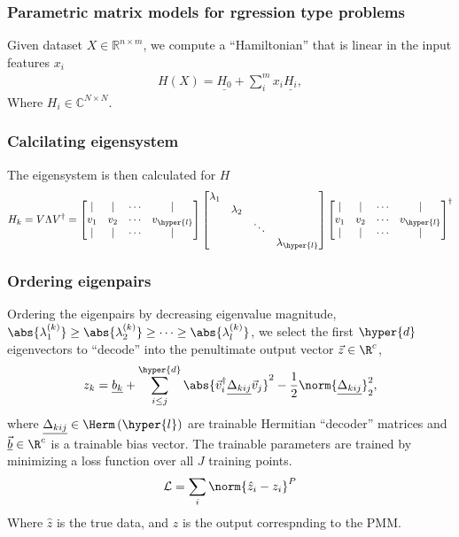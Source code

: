 \documentclass{beamer}
\begin{document}
\begin{frame}
\frametitle{Parametric matrix models for rgression type problems}

Given dataset $X\in \mathbb{R}^{n\times m}$, we compute a ``Hamiltonian'' that is linear in the input features $x_i$
\[
\begin{aligned}
        H(X) = \underline{H_0} +\sum_i^mx_i\underline{H_i},
\end{aligned}
\]
Where $H_i\in \mathbb{C}^{N\times N}$.
\end{frame}

\begin{frame}
\frametitle{Calcilating eigensystem}

The eigensystem is then calculated for $H$
\[
    H_k = V\Lambda V^\dagger = %
    \begin{bmatrix}
        \vert & \vert & \cdots & \vert \\
        v_1 & v_2 & \cdots & v_{\hyper{l}}\\
        \vert & \vert & \cdots & \vert
    \end{bmatrix}%
    \begin{bmatrix}
        \lambda_1 & & & \\
        & \lambda_2 & & \\
        & & \ddots & \\
        & & & \lambda_{\hyper{l}}
    \end{bmatrix}%
    \begin{bmatrix}
        \vert & \vert & \cdots & \vert \\
        v_1 & v_2 & \cdots & v_{\hyper{l}}\\
        \vert & \vert & \cdots & \vert
    \end{bmatrix}^\dagger
\]
\end{frame}

\begin{frame}
\frametitle{Ordering eigenpairs}

Ordering the eigenpairs by decreasing eigenvalue magnitude, $\abs{\lambda^{(k)}_1}\geq\abs{\lambda^{(k)}_2}\geq\cdots\geq\abs{\lambda^{(k)}_l}$, we select the first $\hyper{d}$ eigenvectors to ``decode'' into the penultimate output vector $\vec{z}\in\R^c$,
\[
    z_k = \underline{b_k} + \sum_{i\leq j}^{\hyper{d}}\abs{\vec{v}_i^\dagger \underline{\Delta_{kij}} \vec{v}_j}^2 - \frac{1}{2}\norm{\underline{\Delta_{kij}}}_2^2,
\]
where $\underline{\Delta_{kij}}\in\Herm\left(\hyper{l}\right)$ are trainable Hermitian ``decoder'' matrices and $\underline{\vec{b}}\in\R^c$ is a trainable bias vector. The trainable parameters are trained by minimizing a loss function over all $J$ training points.
\[
    \mathcal{L} = \sum_i\norm{\hat{z}_i-z_i}^P
\]
Where $\hat{z}$ is the true data, and $z$ is the output correspnding to the PMM.
\end{frame}
\end{document}

